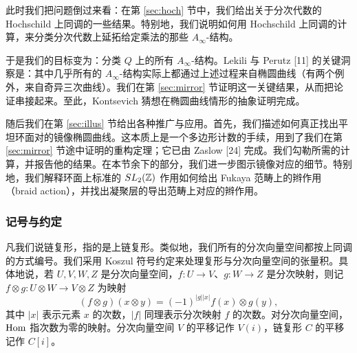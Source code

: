 
此时我们把问题倒过来看：在第 \ref{sec:hoch} 节中，我们给出关于分次代数的 Hochschild 上同调的一些结果。特别地，我们说明如何用 Hochschild 上同调的计算，来分类分次代数上延拓给定乘法的那些 $A_\infty$-结构。

于是我们的目标变为：分类 $Q$ 上的所有 $A_\infty$-结构。Lekili 与 Perutz [11] 的关键洞察是：其中几乎所有的 $A_\infty$-结构实际上都通过上述过程来自椭圆曲线（有两个例外，来自奇异三次曲线）。我们在第 \ref{sec:mirror} 节证明这一关键结果，从而把论证串接起来。至此，Kontsevich 猜想在椭圆曲线情形的抽象证明完成。


随后我们在第 \ref{sec:illus} 节给出各种推广与应用。首先，我们描述如何真正找出平坦环面对的镜像椭圆曲线。这本质上是一个多边形计数的手续，用到了我们在第 \ref{sec:mirror} 节途中证明的重构定理；它已由 Zaslow [24] 完成。我们勾勒所需的计算，并报告他的结果。在本节余下的部分，我们进一步图示镜像对应的细节。特别地，我们解释环面上标准的 $SL_2(\mathbb{Z})$ 作用如何给出 Fukaya 范畴上的辫作用（braid action），并找出凝聚层的导出范畴上对应的辫作用。

\subsubsection*{记号与约定}

凡我们说链复形，指的是上链复形。类似地，我们所有的分次向量空间都按上同调的方式编号。我们采用 Koszul 符号约定来处理复形与分次向量空间的张量积。具体地说，若 $U,V,W,Z$ 是分次向量空间，$f:U\to V$、$g:W\to Z$ 是分次映射，则记 $f\otimes g:U\otimes W\to V\otimes Z$ 为映射
\[
  (f\otimes g)(x\otimes y) = (-1)^{|g||x|}f(x)\otimes g(y),
\]
其中 $|x|$ 表示元素 $x$ 的次数，$|f|$ 同理表示分次映射 $f$ 的次数。对分次向量空间，$\operatorname{Hom}$ 指次数为零的映射。分次向量空间 $V$ 的平移记作 $V(i)$，链复形 $C$ 的平移记作 $C[i]$。


